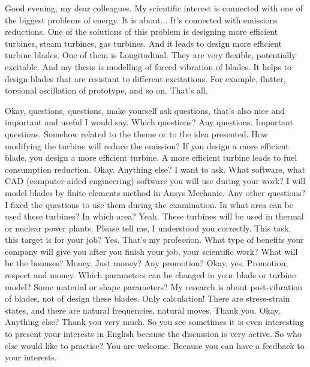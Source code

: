 \documentclass[main.tex]{subfiles}
\begin{document}
Good evening, my dear colleagues.
My scientific interest is connected with one of the biggest problems of energy.
It is about...
It's connected with emissions reductions.
One of the solutions of this problem is designing more efficient turbines, steam turbines, gas turbines.
And it leads to design more efficient turbine blades.
One of them is Longitudinal.
They are very flexible, potentially excitable.
And my thesis is modelling of forced vibration of blades.
It helps to design blades that are resistant to different excitations.
For example, flutter, torsional oscillation of prototype, and so on.
That's all.

Okay, questions, questions, make yourself ask questions, that's also nice and important and useful I would say.
Which questions? Any questions.
Important questions.
Somehow related to the theme or to the idea presented.
How modifying the turbine will reduce the emission?
If you design a more efficient blade, you design a more efficient turbine.
A more efficient turbine leads to fuel consumption reduction.
Okay.
Anything else?
I want to ask.
What software, what CAD (computer-aided engineering) software you will use during your work?
I will model blades by finite elements method in Ansys Mechanic.
Any other questions? I fixed the questions to use them during the examination.
In what area can be used these turbines?
In which area?
Yeah.
These turbines will be used in thermal or nuclear power plants.
Please tell me, I understood you correctly.
This task, this target is for your job?
Yes.
That's my profession.
What type of benefits your company will give you after you finish your job, your scientific work?
What will be the bonuses?
Money.
Just money?
Any promotion?
Okay, yes.
Promotion, respect and money.
Which parameters can be changed in your blade or turbine model?
Some material or shape parameters?
My research is about post-vibration of blades, not of design these blades.
Only calculation!
There are stress-strain states, and there are natural frequencies, natural moves.
Thank you.
Okay.
Anything else? Thank you very much.
So you see sometimes it is even interesting to present your interests in English because the discussion is very active.
So who else would like to practise?
You are welcome.
Because you can have a feedback to your interests.
\end{document}
